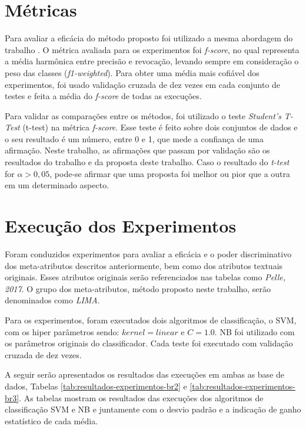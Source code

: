 \section{Métricas}\label{sec:proposta-metricas}
Para avaliar a eficácia do método proposto foi utilizado a mesma abordagem do trabalho \cite{Pelle2017}. O métrica avaliada para os experimentos foi {\it f-score}, no qual representa a média harmônica entre precisão e revocação, levando sempre em consideração o peso das classes ({\it f1-weighted}). Para obter uma média mais cofiável dos experimentos, foi usado validação cruzada de dez vezes em cada conjunto de testes e feita a média do {\it f-score} de todas as execuções. 

Para validar as comparações entre os métodos, foi utilizado o teste {\it Student’s T-Test} (t-test) na métrica {\it f-score}. Esse teste é feito sobre dois conjuntos de dados e o seu resultado é um número, entre 0 e 1, que mede a confiança de uma afirmação. Neste trabalho, as afirmações que passam por validação são os resultados do trabalho \cite{Pelle2017} e da proposta deste trabalho. Caso o resultado do {\it t-test} for $\alpha > 0,05$, pode-se afirmar que uma proposta foi melhor ou pior que a outra em um determinado aspecto.

\section{Execução dos Experimentos}\label{sec:proposta-experimentos}

Foram conduzidos experimentos para avaliar a eficácia e o poder discriminativo dos meta-atributos
descritos anteriormente, bem como dos atributos textuais originais. Esses atributos originais serão referenciados nas tabelas como {\it Pelle, 2017}. O grupo dos meta-atributos, método proposto neste trabalho, serão denominados como {\it LIMA}.

Para os experimentos, foram executados dois algoritmos de classificação, o SVM, com os hiper parâmetros sendo: $kernel=linear$ e $C=1.0$. NB foi utilizado com os parâmetros originais do classificador. Cada teste foi executado com validação cruzada de dez vezes. 

A seguir serão apresentados os resultados das execuções em ambas as base de dados, Tabelas \ref{tab:resultados-experimentos-br2} e \ref{tab:resultados-experimentos-br3}. As tabelas mostram os resultados das execuções dos algoritmos de classificação SVM e NB e juntamente com o desvio padrão e a indicação de ganho estatístico de cada média. 

